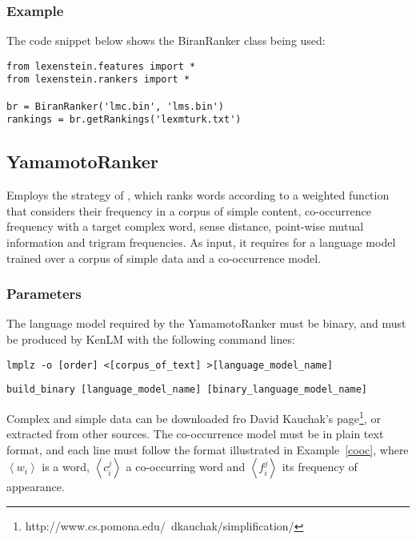 \subsubsection{Example}

The code snippet below shows the BiranRanker class being used:

\begin{lstlisting}
from lexenstein.features import *
from lexenstein.rankers import *

br = BiranRanker('lmc.bin', 'lms.bin')
rankings = br.getRankings('lexmturk.txt')
\end{lstlisting}















\subsection{YamamotoRanker}

Employs the strategy of \cite{Yamamoto2013}, which ranks words according to a weighted function that considers their frequency in a corpus of simple content, co-occurrence frequency with a target complex word, sense distance, point-wise mutual information and trigram frequencies. As input, it requires for a language model trained over a corpus of simple data and a co-occurrence model.

\subsubsection{Parameters}

The language model required by the YamamotoRanker must be binary, and must be produced by KenLM with the following command lines:

\begin{lstlisting}
lmplz -o [order] <[corpus_of_text] >[language_model_name]
\end{lstlisting}
\begin{lstlisting}
build_binary [language_model_name] [binary_language_model_name]
\end{lstlisting}

Complex and simple data can be downloaded fro David Kauchak's page\footnote{http://www.cs.pomona.edu/~dkauchak/simplification/}, or extracted from other sources. The co-occurrence model must be in plain text format, and each line must follow the format illustrated in Example~\ref{cooc}, where $\left\langle w_{i} \right\rangle$ is a word, $\left\langle c_{i}^{j} \right\rangle$ a co-occurring word and $\left\langle f_{i}^{j} \right\rangle$ its frequency of appearance.

